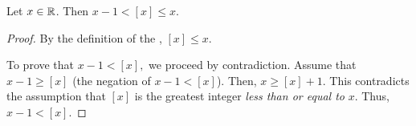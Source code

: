 \documentclass{../ximera}
\begin{document}
\begin{lem*}\label{lem:floor-inter}
  Let $x\in\mathbb R$. Then $x-1<[x]\leq x$.
  
  \begin{proof}
    By the definition of the , $[x]\leq x$. 

    To prove that $x-1<[x],$ we proceed by contradiction. Assume that $x-1\geq [x]$ (the negation of $x-1<[x]$). Then, $x\geq [x]+1$. This contradicts the assumption that $[x]$ is the greatest integer \emph{less than or equal to} $x$. Thus, $x-1<[x].$
  \end{proof}
\end{lem*}


%
%
\end{document}
